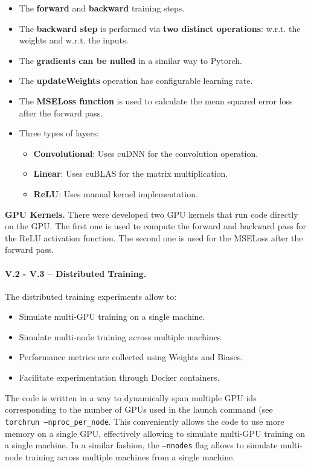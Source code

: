 \begin{itemize}
	\item The \textbf{forward} and \textbf{backward} training steps.
	\item The \textbf{backward step} is performed via \textbf{two distinct operations}: w.r.t. the weights and w.r.t. the inputs.
	\item The \textbf{gradients can be nulled} in a similar way to Pytorch.
	\item The \textbf{updateWeights} operation has configurable learning rate.
	\item The \textbf{MSELoss function} is used to calculate the mean squared error loss after the forward pass. 
	\item Three types of layers:
	\begin{itemize}
		\item \textbf{Convolutional}: Uses cuDNN for the convolution operation.
		\item \textbf{Linear}: Uses cuBLAS for the matrix multiplication.
		\item \textbf{ReLU}: Uses manual kernel implementation.
	\end{itemize}
\end{itemize}

\textbf{GPU Kernels.}
There were developed two GPU kernels that run code directly on the GPU. The first one is used 
to compute the forward and backward pass for the ReLU activation function. The second one is used
for the MSELoss after the forward pass.

\paragraph{V.2 - V.3 -- Distributed Training.}
The distributed training experiments allow to:

\begin{itemize}
	\item Simulate multi-GPU training on a single machine.
	\item Simulate multi-node training across multiple machines.
	\item Performance metrics are collected using Weights and Biases.
	\item Facilitate experimentation through Docker containers.
\end{itemize}

The code is written in a way to dynamically span multiple GPU ids corresponding to the number of
GPUs used in the launch command (see \texttt{torchrun --nproc\_per\_node}. This conveniently allows
the code to use more memory on a single GPU, effectively allowing to simulate multi-GPU training on
a single machine. In a similar fashion, the \texttt{--nnodes} flag allows to simulate multi-node
training across multiple machines from a single machine.

